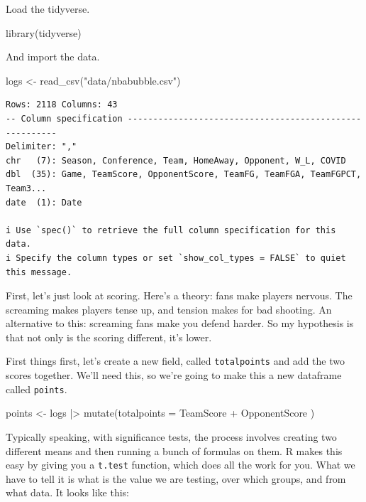 \documentclass[
  letterpaper,
  DIV=11,
  numbers=noendperiod]{scrreprt}
\newenvironment{Shaded}{\begin{snugshade}}{\end{snugshade}}
\newcommand{\AttributeTok}[1]{\textcolor[rgb]{0.40,0.45,0.13}{#1}}
\newcommand{\FunctionTok}[1]{\textcolor[rgb]{0.28,0.35,0.67}{#1}}
\newcommand{\NormalTok}[1]{\textcolor[rgb]{0.00,0.23,0.31}{#1}}
\newcommand{\OtherTok}[1]{\textcolor[rgb]{0.00,0.23,0.31}{#1}}
\newcommand{\SpecialCharTok}[1]{\textcolor[rgb]{0.37,0.37,0.37}{#1}}
\newcommand{\StringTok}[1]{\textcolor[rgb]{0.13,0.47,0.30}{#1}}
\begin{document}
Load the tidyverse.

\begin{Shaded}
\begin{Highlighting}[]
\FunctionTok{library}\NormalTok{(tidyverse)}
\end{Highlighting}
\end{Shaded}

And import the data.

\begin{Shaded}
\begin{Highlighting}[]
\NormalTok{logs }\OtherTok{\textless{}{-}} \FunctionTok{read\_csv}\NormalTok{(}\StringTok{"data/nbabubble.csv"}\NormalTok{)}
\end{Highlighting}
\end{Shaded}

\begin{verbatim}
Rows: 2118 Columns: 43
-- Column specification --------------------------------------------------------
Delimiter: ","
chr   (7): Season, Conference, Team, HomeAway, Opponent, W_L, COVID
dbl  (35): Game, TeamScore, OpponentScore, TeamFG, TeamFGA, TeamFGPCT, Team3...
date  (1): Date

i Use `spec()` to retrieve the full column specification for this data.
i Specify the column types or set `show_col_types = FALSE` to quiet this message.
\end{verbatim}

First, let's just look at scoring. Here's a theory: fans make players
nervous. The screaming makes players tense up, and tension makes for bad
shooting. An alternative to this: screaming fans make you defend harder.
So my hypothesis is that not only is the scoring different, it's lower.

First things first, let's create a new field, called
\texttt{totalpoints} and add the two scores together. We'll need this,
so we're going to make this a new dataframe called \texttt{points}.

\begin{Shaded}
\begin{Highlighting}[]
\NormalTok{points }\OtherTok{\textless{}{-}}\NormalTok{ logs }\SpecialCharTok{|\textgreater{}} \FunctionTok{mutate}\NormalTok{(}\AttributeTok{totalpoints =}\NormalTok{ TeamScore }\SpecialCharTok{+}\NormalTok{ OpponentScore )}
\end{Highlighting}
\end{Shaded}

Typically speaking, with significance tests, the process involves
creating two different means and then running a bunch of formulas on
them. R makes this easy by giving you a \texttt{t.test} function, which
does all the work for you. What we have to tell it is what is the value
we are testing, over which groups, and from what data. It looks like
this:
\end{document}
